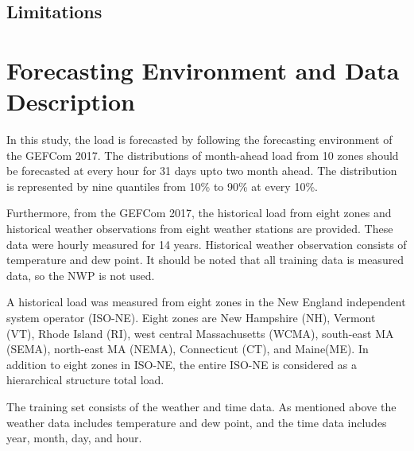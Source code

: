\documentclass[journal]{IEEEtran} %
\begin{document}
\subsection{Limitations}










































\newpage
\section{Forecasting Environment and Data Description}

In this study, the load is forecasted by following the forecasting environment of the GEFCom 2017. The distributions of month-ahead load from 10 zones should be forecasted at every hour for 31 days upto two month ahead. The distribution is represented by nine quantiles from 10\% to 90\% at every 10\%. 


Furthermore, from the GEFCom 2017, the historical load from eight zones and historical weather observations from eight weather stations are provided. These data were hourly measured for 14 years. Historical weather observation consists of temperature and dew point. It should be noted that all training data is measured data, so the NWP is not used. 

A historical load was measured from eight zones in the New England independent system operator (ISO-NE). Eight zones are New Hampshire (NH), Vermont (VT), Rhode Island (RI), west central Massachusetts (WCMA), south-east MA (SEMA), north-east MA (NEMA), Connecticut (CT), and Maine(ME). In addition to eight zones in ISO-NE, the entire ISO-NE is considered as a hierarchical structure total load.

The training set consists of the weather and time data. As mentioned above the weather data includes temperature and dew point, and the time data includes year, month, day, and hour. 
\end{document}
